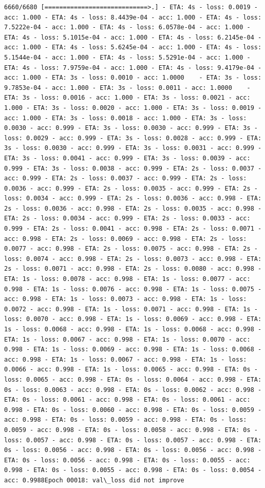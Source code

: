 \documentclass[11pt]{article}
\begin{document}
\begin{Verbatim}[commandchars=\\\{\}]
6660/6680 [============================>.] - ETA: 4s - loss: 0.0019 - acc: 1.000 - ETA: 4s - loss: 8.4439e-04 - acc: 1.000 - ETA: 4s - loss: 7.5222e-04 - acc: 1.000 - ETA: 4s - loss: 6.0578e-04 - acc: 1.000 - ETA: 4s - loss: 5.1015e-04 - acc: 1.000 - ETA: 4s - loss: 6.2145e-04 - acc: 1.000 - ETA: 4s - loss: 5.6245e-04 - acc: 1.000 - ETA: 4s - loss: 5.1544e-04 - acc: 1.000 - ETA: 4s - loss: 5.5291e-04 - acc: 1.000 - ETA: 4s - loss: 7.9759e-04 - acc: 1.000 - ETA: 4s - loss: 9.4179e-04 - acc: 1.000 - ETA: 3s - loss: 0.0010 - acc: 1.0000    - ETA: 3s - loss: 9.7853e-04 - acc: 1.000 - ETA: 3s - loss: 0.0011 - acc: 1.0000    - ETA: 3s - loss: 0.0016 - acc: 1.000 - ETA: 3s - loss: 0.0021 - acc: 1.000 - ETA: 3s - loss: 0.0020 - acc: 1.000 - ETA: 3s - loss: 0.0019 - acc: 1.000 - ETA: 3s - loss: 0.0018 - acc: 1.000 - ETA: 3s - loss: 0.0030 - acc: 0.999 - ETA: 3s - loss: 0.0030 - acc: 0.999 - ETA: 3s - loss: 0.0029 - acc: 0.999 - ETA: 3s - loss: 0.0028 - acc: 0.999 - ETA: 3s - loss: 0.0030 - acc: 0.999 - ETA: 3s - loss: 0.0031 - acc: 0.999 - ETA: 3s - loss: 0.0041 - acc: 0.999 - ETA: 3s - loss: 0.0039 - acc: 0.999 - ETA: 3s - loss: 0.0038 - acc: 0.999 - ETA: 2s - loss: 0.0037 - acc: 0.999 - ETA: 2s - loss: 0.0037 - acc: 0.999 - ETA: 2s - loss: 0.0036 - acc: 0.999 - ETA: 2s - loss: 0.0035 - acc: 0.999 - ETA: 2s - loss: 0.0034 - acc: 0.999 - ETA: 2s - loss: 0.0036 - acc: 0.998 - ETA: 2s - loss: 0.0036 - acc: 0.998 - ETA: 2s - loss: 0.0035 - acc: 0.998 - ETA: 2s - loss: 0.0034 - acc: 0.999 - ETA: 2s - loss: 0.0033 - acc: 0.999 - ETA: 2s - loss: 0.0041 - acc: 0.998 - ETA: 2s - loss: 0.0071 - acc: 0.998 - ETA: 2s - loss: 0.0069 - acc: 0.998 - ETA: 2s - loss: 0.0077 - acc: 0.998 - ETA: 2s - loss: 0.0075 - acc: 0.998 - ETA: 2s - loss: 0.0074 - acc: 0.998 - ETA: 2s - loss: 0.0073 - acc: 0.998 - ETA: 2s - loss: 0.0071 - acc: 0.998 - ETA: 2s - loss: 0.0080 - acc: 0.998 - ETA: 1s - loss: 0.0078 - acc: 0.998 - ETA: 1s - loss: 0.0077 - acc: 0.998 - ETA: 1s - loss: 0.0076 - acc: 0.998 - ETA: 1s - loss: 0.0075 - acc: 0.998 - ETA: 1s - loss: 0.0073 - acc: 0.998 - ETA: 1s - loss: 0.0072 - acc: 0.998 - ETA: 1s - loss: 0.0071 - acc: 0.998 - ETA: 1s - loss: 0.0070 - acc: 0.998 - ETA: 1s - loss: 0.0069 - acc: 0.998 - ETA: 1s - loss: 0.0068 - acc: 0.998 - ETA: 1s - loss: 0.0068 - acc: 0.998 - ETA: 1s - loss: 0.0067 - acc: 0.998 - ETA: 1s - loss: 0.0070 - acc: 0.998 - ETA: 1s - loss: 0.0069 - acc: 0.998 - ETA: 1s - loss: 0.0068 - acc: 0.998 - ETA: 1s - loss: 0.0067 - acc: 0.998 - ETA: 1s - loss: 0.0066 - acc: 0.998 - ETA: 1s - loss: 0.0065 - acc: 0.998 - ETA: 0s - loss: 0.0065 - acc: 0.998 - ETA: 0s - loss: 0.0064 - acc: 0.998 - ETA: 0s - loss: 0.0063 - acc: 0.998 - ETA: 0s - loss: 0.0062 - acc: 0.998 - ETA: 0s - loss: 0.0061 - acc: 0.998 - ETA: 0s - loss: 0.0061 - acc: 0.998 - ETA: 0s - loss: 0.0060 - acc: 0.998 - ETA: 0s - loss: 0.0059 - acc: 0.998 - ETA: 0s - loss: 0.0059 - acc: 0.998 - ETA: 0s - loss: 0.0059 - acc: 0.998 - ETA: 0s - loss: 0.0058 - acc: 0.998 - ETA: 0s - loss: 0.0057 - acc: 0.998 - ETA: 0s - loss: 0.0057 - acc: 0.998 - ETA: 0s - loss: 0.0056 - acc: 0.998 - ETA: 0s - loss: 0.0056 - acc: 0.998 - ETA: 0s - loss: 0.0056 - acc: 0.998 - ETA: 0s - loss: 0.0055 - acc: 0.998 - ETA: 0s - loss: 0.0055 - acc: 0.998 - ETA: 0s - loss: 0.0054 - acc: 0.9988Epoch 00018: val\_loss did not improve

\end{Verbatim}
\end{document}
